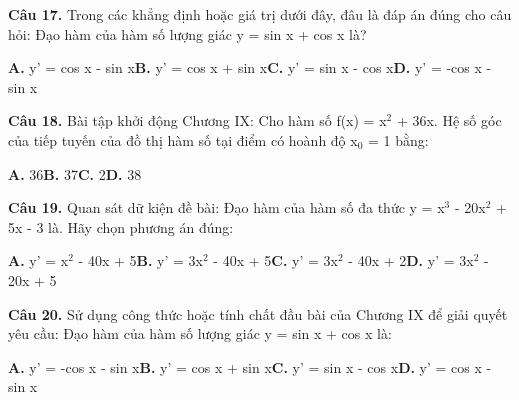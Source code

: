 \documentclass[11pt,a4paper]{article}
\begin{document}
\textbf{\color{primary} Câu 17.} Trong các khẳng định hoặc giá trị dưới đây, đâu là đáp án đúng cho câu hỏi: Đạo hàm của hàm số lượng giác y = sin x + cos x là?\par
\hspace*{1.5em}\textbf{A.} y' = cos x - sin x\quad\quad \textbf{B.} y' = cos x + sin x\quad\quad \textbf{C.} y' = sin x - cos x\quad\quad \textbf{D.} y' = -cos x - sin x\par\vspace{2pt}
\textbf{\color{primary} Câu 18.} Bài tập khởi động Chương IX: Cho hàm số f(x) = x$^2$ + 36x. Hệ số góc của tiếp tuyến của đồ thị hàm số tại điểm có hoành độ x$_0$ = 1 bằng:\par
\hspace*{1.5em}\textbf{A.} 36\quad\quad \textbf{B.} 37\quad\quad \textbf{C.} 2\quad\quad \textbf{D.} 38\par\vspace{2pt}
\textbf{\color{primary} Câu 19.} Quan sát dữ kiện đề bài: Đạo hàm của hàm số đa thức y = x$^3$ - 20x$^2$ + 5x - 3 là. Hãy chọn phương án đúng:\par
\hspace*{1.5em}\textbf{A.} y' = x$^2$ - 40x + 5\quad\quad \textbf{B.} y' = 3x$^2$ - 40x + 5\quad\quad \textbf{C.} y' = 3x$^2$ - 40x + 2\quad\quad \textbf{D.} y' = 3x$^2$ - 20x + 5\par\vspace{2pt}
\textbf{\color{primary} Câu 20.} Sử dụng công thức hoặc tính chất đầu bài của Chương IX để giải quyết yêu cầu: Đạo hàm của hàm số lượng giác y = sin x + cos x là:\par
\hspace*{1.5em}\textbf{A.} y' = -cos x - sin x\quad\quad \textbf{B.} y' = cos x + sin x\quad\quad \textbf{C.} y' = sin x - cos x\quad\quad \textbf{D.} y' = cos x - sin x\par\vspace{2pt}
\end{document}
